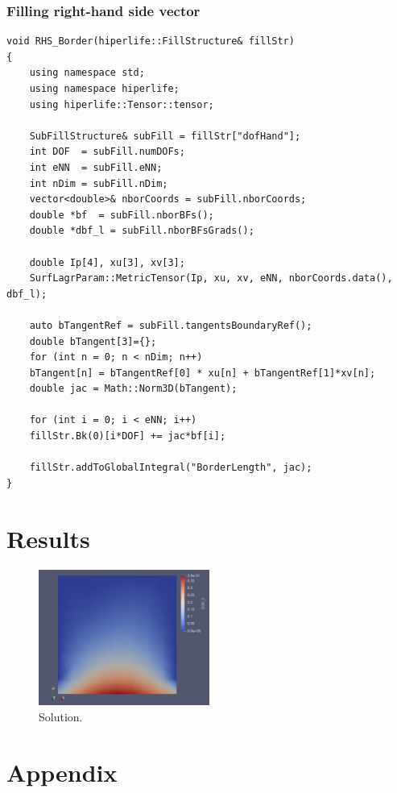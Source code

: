 \documentclass[]{article}
\begin{document}
\subsubsection{Filling right-hand side vector} \label{sec: rhs}
\begin{lstlisting}
void RHS_Border(hiperlife::FillStructure& fillStr)
{
	using namespace std;
	using namespace hiperlife;
	using hiperlife::Tensor::tensor;

	SubFillStructure& subFill = fillStr["dofHand"];
	int DOF  = subFill.numDOFs;
	int eNN  = subFill.eNN; 
	int nDim = subFill.nDim;
	vector<double>& nborCoords = subFill.nborCoords;
	double *bf  = subFill.nborBFs();
	double *dbf_l = subFill.nborBFsGrads();
	
	double Ip[4], xu[3], xv[3];
	SurfLagrParam::MetricTensor(Ip, xu, xv, eNN, nborCoords.data(), dbf_l);
	
	auto bTangentRef = subFill.tangentsBoundaryRef();
	double bTangent[3]={};
	for (int n = 0; n < nDim; n++)
	bTangent[n] = bTangentRef[0] * xu[n] + bTangentRef[1]*xv[n];
	double jac = Math::Norm3D(bTangent);
	
	for (int i = 0; i < eNN; i++)
	fillStr.Bk(0)[i*DOF] += jac*bf[i];
	
	fillStr.addToGlobalIntegral("BorderLength", jac);
}
\end{lstlisting}
\section{Results} \label{sec: rst}
\begin{figure}[htbp]
	\centering
	\includegraphics[width=0.5\textwidth]{Figures/result.png}
	\caption{Solution.}
	\label{fig_rst}
\end{figure}
\pagebreak
\section*{Appendix} \label{sec: apx}
\end{document}
